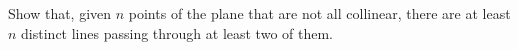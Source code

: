Show that, given $n$ points of the plane that are not all collinear, there are at least $n$ distinct lines passing through at least two of them.
